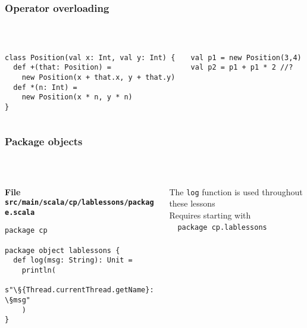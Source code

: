 \documentclass[aspectratio=169]{beamer}
\begin{document}
\begin{frame}[fragile]\frametitle{Operator overloading}
~\\[-8mm]
\begin{columns}
\begin{column}{0.56\textwidth}
\begin{lstlisting}
class Position(val x: Int, val y: Int) {
  def +(that: Position) =
    new Position(x + that.x, y + that.y)
  def *(n: Int) =
    new Position(x * n, y * n)
}
\end{lstlisting}
\end{column}
\begin{column}{0.42\textwidth}
\begin{lstlisting}
val p1 = new Position(3,4)
val p2 = p1 + p1 * 2 //?
\end{lstlisting}
\end{column}
\end{columns}
\end{frame}


\begin{frame}[fragile]\frametitle{Package objects}
~\\[-8mm]
\begin{columns}
\begin{column}{0.62\textwidth}
\alert{\textbf{File \texttt{src/main/scala/cp/lablessons/package.scala}}}
\begin{lstlisting}[emph={log}]
package cp

package object lablessons {
  def log(msg: String): Unit =
    println(
      s"\§{Thread.currentThread.getName}: \§msg"
    )
}
\end{lstlisting}
\end{column}
\begin{column}{0.40\textwidth}
The \texttt{log} function is used throughout these lessons
\\[4mm]
Requires starting with\\~~\texttt{package cp.lablessons}
\end{column}
\end{columns}
\end{frame}
\end{document}
